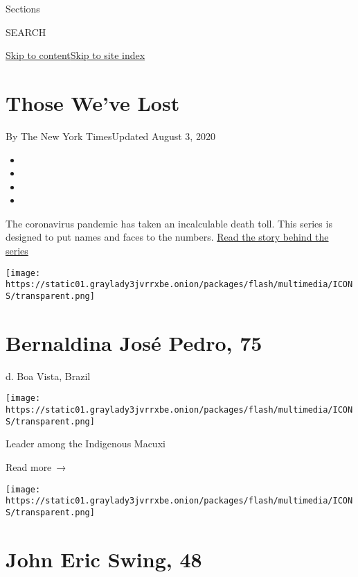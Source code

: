 Sections

SEARCH

\protect\hyperlink{site-content}{Skip to
content}\protect\hyperlink{site-index}{Skip to site index}

\hypertarget{those-weve-lost}{%
\section{Those We've Lost}\label{those-weve-lost}}

By The New York TimesUpdated August 3, 2020

\begin{itemize}
\item
\item
\item
\item
\end{itemize}

The coronavirus pandemic has taken an incalculable death toll. This
series is designed to put names and faces to the numbers.
\href{https://www.nytimes3xbfgragh.onion/2020/04/16/reader-center/coronavirus-obits.html}{Read
the story behind the series}

\href{https://www.nytimes3xbfgragh.onion/2020/08/03/obituaries/bernaldina-jose-pedro-dead-coronavirus.html}{}

\texttt{[image: https://static01.graylady3jvrrxbe.onion/packages/flash/multimedia/ICONS/transparent.png]}

\hypertarget{bernaldina-josuxe9-pedro-75}{%
\section{Bernaldina José Pedro, 75}\label{bernaldina-josuxe9-pedro-75}}

d. Boa Vista, Brazil

\texttt{[image: https://static01.graylady3jvrrxbe.onion/packages/flash/multimedia/ICONS/transparent.png]}

Leader among the Indigenous Macuxi

 Read more~→

\href{https://www.nytimes3xbfgragh.onion/2020/08/03/obituaries/john-swing-dead-coronavirus.html}{}

\texttt{[image: https://static01.graylady3jvrrxbe.onion/packages/flash/multimedia/ICONS/transparent.png]}

\hypertarget{john-eric-swing-48}{%
\section{John Eric Swing, 48}\label{john-eric-swing-48}}

